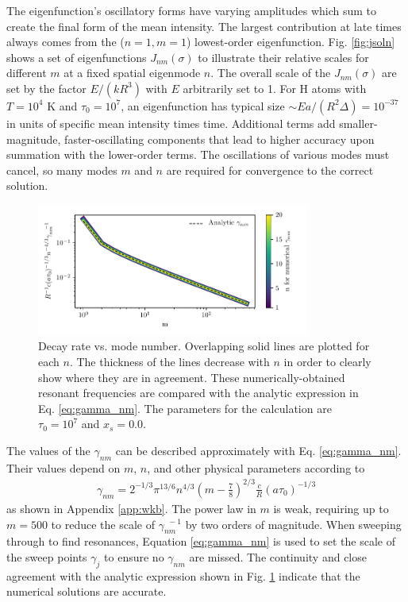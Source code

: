 \documentclass[linenumbers]{aastex63}
\newcommand{\be}{\begin{eqnarray}}
\newcommand{\ee}{\end{eqnarray}}
\begin{document}
The eigenfunction's oscillatory forms have varying amplitudes which sum to create the final form of the mean intensity. The largest contribution at late times always comes from the ($n=1, m=1$) lowest-order eigenfunction. Fig. \ref{fig:jsoln} shows a set of eigenfunctions $J_{nm}(\sigma)$ to illustrate their relative scales for different $m$ at a fixed spatial eigenmode $n$. The overall scale of the $J_{nm}(\sigma)$ are set by the factor $E/(kR^3)$ with $E$ arbitrarily set to 1. For H atoms with $T=10^4$ K and $\tau_0=10^7$, an eigenfunction has typical size ${\sim} E a / \left(R^2 \Delta \right) = 10^{-37}$ in units of specific mean intensity times time. Additional terms add smaller-magnitude, faster-oscillating components that lead to higher accuracy upon summation with the lower-order terms. The oscillations of various modes must cancel, so many modes $m$ and $n$ are required for convergence to the correct solution. 
\begin{figure}
    \centering
    \includegraphics[width=0.8\textwidth]{gamma_nm.pdf}
    \caption{Decay rate vs. mode number. Overlapping solid lines are plotted for each $n$. The thickness of the lines decrease with $n$ in order to clearly show where they are in agreement. These numerically-obtained resonant frequencies are compared with the analytic expression in Eq. \ref{eq:gamma_nm}. The parameters for the calculation are $\tau_0=10^7$ and $x_s=0.0$.}
    \label{fig:gamma_nm}
\end{figure}
The values of the $\gamma_{nm}$ can be described approximately with Eq. \ref{eq:gamma_nm}. Their values depend on $m$, $n$, and other physical parameters according to 
\be \label{eq:gamma_nm}
\gamma_{nm} = 2^{-1/3} \pi^{13/6} n^{4/3}\left(m-\frac{7}{8}\right)^{2/3}\frac{c}{R}(a\tau_0)^{-1/3}
\ee
as shown in Appendix \ref{app:wkb}. The power law in $m$ is weak, requiring up to $m=500$ to reduce the scale of $\gamma_{nm}^{\ \ -1}$ by two orders of magnitude. When sweeping through to find resonances, Equation \ref{eq:gamma_nm} is used to set the scale of the sweep points $\gamma_j$ to ensure no $\gamma_{nm}$ are missed. The continuity and close agreement with the analytic expression shown in Fig. \ref{fig:gamma_nm} indicate that the numerical solutions are accurate.
\end{document}
